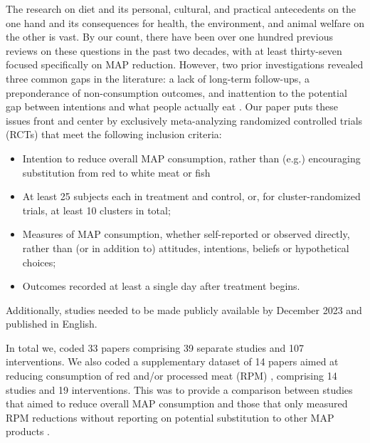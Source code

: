 \documentclass[sn-nature,pdflatex]{sn-jnl}
\begin{document}
The research on diet and its personal, cultural, and practical
antecedents on the one hand and its consequences for health, the
environment, and animal welfare on the other is vast. By our count,
there have been over one hundred previous reviews on these questions in
the past two decades, with at least thirty-seven focused specifically on
MAP reduction. However, two prior investigations revealed three common
gaps in the literature: a lack of long-term follow-ups, a preponderance
of non-consumption outcomes, and inattention to the potential gap
between intentions and what people actually eat
\citep{mathur2021meta, mathur2021effectiveness}. Our paper puts these
issues front and center by exclusively meta-analyzing randomized
controlled trials (RCTs) that meet the following inclusion criteria:

\begin{itemize}
\item
  Intention to reduce overall MAP consumption, rather than (e.g.)
  encouraging substitution from red to white meat or fish
\item
  At least 25 subjects each in treatment and control, or, for
  cluster-randomized trials, at least 10 clusters in total;
\item
  Measures of MAP consumption, whether self-reported or observed
  directly, rather than (or in addition to) attitudes, intentions,
  beliefs or hypothetical choices;
\item
  Outcomes recorded at least a single day after treatment begins.
\end{itemize}

Additionally, studies needed to be made publicly available by December
2023 and published in English.

In total we, coded 33 papers
\citep{abrahamse2007, alblas2023, aldoh2023, allen2002, andersson2021, acharya2004, berndsen2005, bertolaso2015, bianchi2022, bochmann2017, bschaden2020, carfora2023, coker2022, cooney2016, fehrenbach2015, feltz2022, griesoph2021, haile2021, hatami2018, hennessy2016, jalil2023, lacroix2020, mathur2021effectiveness, mattson2020, merrill2009, norris2014, peacock2017, piester2020, polanco2022, sparkman2017, sparkman2020, sparkman2021, weingarten2022}
comprising 39 separate studies and 107 interventions. We also coded a
supplementary dataset of 14 papers aimed at reducing consumption of red
and/or processed meat (RPM)
\citep{carfora2017correlational, carfora2017randomised, carfora2019, carfora2019informational, delichatsios2001, dijkstra2022, emmons2005cancer, emmons2005project, jaacks2014, james2015, lee2018, perino2022, schatzkin2000, sorensen2005},
comprising 14 studies and 19 interventions. This was to provide a
comparison between studies that aimed to reduce overall MAP consumption
and those that only measured RPM reductions without reporting on
potential substitution to other MAP products \citep{mathur2022ethical}.
\end{document}
